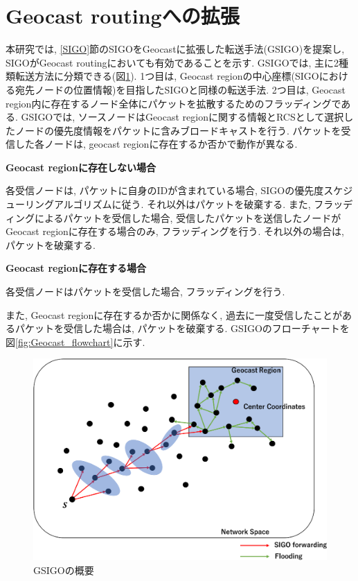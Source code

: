 \documentclass[10pt]{jreport}
\begin{document}
\section{Geocast routingへの拡張}
本研究では, \ref{SIGO}節のSIGOをGeocastに拡張した転送手法(GSIGO)を提案し, SIGOがGeocast routingにおいても有効であることを示す. GSIGOでは, 主に2種類転送方法に分類できる(図\ref{fig:Geocast}). 1つ目は, Geocast regionの中心座標(SIGOにおける宛先ノードの位置情報)を目指したSIGOと同様の転送手法. 2つ目は, Geocast region内に存在するノード全体にパケットを拡散するためのフラッディングである. 
GSIGOでは, ソースノードはGeocast regionに関する情報とRCSとして選択したノードの優先度情報をパケットに含みブロードキャストを行う.
パケットを受信した各ノードは, geocast regionに存在するか否かで動作が異なる.

\par
\vspace{5mm}
\noindent
\textbf{Geocast regionに存在しない場合}
\vspace{5mm}

各受信ノードは, パケットに自身のIDが含まれている場合, SIGOの優先度スケジューリングアルゴリズムに従う. それ以外はパケットを破棄する. また, フラッディングによるパケットを受信した場合, 受信したパケットを送信したノードがGeocast regionに存在する場合のみ, フラッディングを行う. それ以外の場合は, パケットを破棄する.

\par
\vspace{5mm}
\noindent
\textbf{Geocast regionに存在する場合}
\vspace{5mm}

各受信ノードはパケットを受信した場合, フラッディングを行う. 

\par
また, Geocast regionに存在するか否かに関係なく, 過去に一度受信したことがあるパケットを受信した場合は, パケットを破棄する.
GSIGOのフローチャートを図\ref{fig:Geocast_flowchart}に示す.



\begin{figure}[!ht]
	\centering
	\includegraphics[width=130mm]{figures/Geocast.eps}
	\caption{GSIGOの概要}
	\label{fig:Geocast}
\end{figure}
\end{document}
